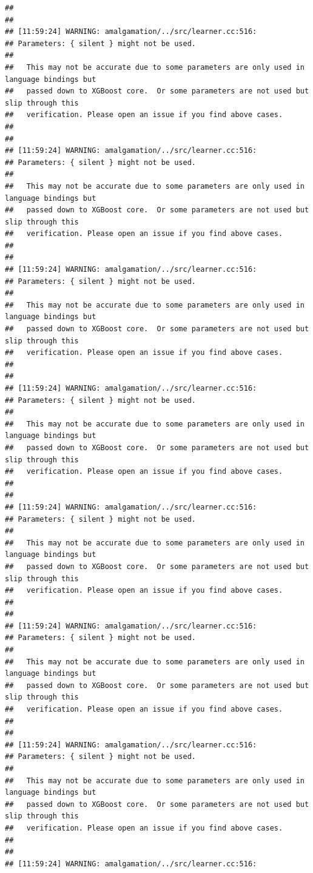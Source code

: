 \documentclass[AMS,STIX2COL]{WileyNJD-v2}\usepackage[]{graphicx}\usepackage[]{color}
\makeatletter
\newenvironment{kframe}{%
 \def\at@end@of@kframe{}%
 \ifinner\ifhmode%
  \def\at@end@of@kframe{\end{minipage}}%
  \begin{minipage}{\columnwidth}%
 \fi\fi%
 \def\FrameCommand##1{\hskip\@totalleftmargin \hskip-\fboxsep
 \colorbox{shadecolor}{##1}\hskip-\fboxsep
     \hskip-\linewidth \hskip-\@totalleftmargin \hskip\columnwidth}%
 \MakeFramed {\advance\hsize-\width
   \@totalleftmargin\z@ \linewidth\hsize
   \@setminipage}}%
 {\par\unskip\endMakeFramed%
 \at@end@of@kframe}
\newenvironment{knitrout}{}{} %
\makeatother
\begin{document}
\begin{knitrout}
\begin{kframe}
\begin{verbatim}
## 
## 
## [11:59:24] WARNING: amalgamation/../src/learner.cc:516: 
## Parameters: { silent } might not be used.
## 
##   This may not be accurate due to some parameters are only used in language bindings but
##   passed down to XGBoost core.  Or some parameters are not used but slip through this
##   verification. Please open an issue if you find above cases.
## 
## 
## [11:59:24] WARNING: amalgamation/../src/learner.cc:516: 
## Parameters: { silent } might not be used.
## 
##   This may not be accurate due to some parameters are only used in language bindings but
##   passed down to XGBoost core.  Or some parameters are not used but slip through this
##   verification. Please open an issue if you find above cases.
## 
## 
## [11:59:24] WARNING: amalgamation/../src/learner.cc:516: 
## Parameters: { silent } might not be used.
## 
##   This may not be accurate due to some parameters are only used in language bindings but
##   passed down to XGBoost core.  Or some parameters are not used but slip through this
##   verification. Please open an issue if you find above cases.
## 
## 
## [11:59:24] WARNING: amalgamation/../src/learner.cc:516: 
## Parameters: { silent } might not be used.
## 
##   This may not be accurate due to some parameters are only used in language bindings but
##   passed down to XGBoost core.  Or some parameters are not used but slip through this
##   verification. Please open an issue if you find above cases.
## 
## 
## [11:59:24] WARNING: amalgamation/../src/learner.cc:516: 
## Parameters: { silent } might not be used.
## 
##   This may not be accurate due to some parameters are only used in language bindings but
##   passed down to XGBoost core.  Or some parameters are not used but slip through this
##   verification. Please open an issue if you find above cases.
## 
## 
## [11:59:24] WARNING: amalgamation/../src/learner.cc:516: 
## Parameters: { silent } might not be used.
## 
##   This may not be accurate due to some parameters are only used in language bindings but
##   passed down to XGBoost core.  Or some parameters are not used but slip through this
##   verification. Please open an issue if you find above cases.
## 
## 
## [11:59:24] WARNING: amalgamation/../src/learner.cc:516: 
## Parameters: { silent } might not be used.
## 
##   This may not be accurate due to some parameters are only used in language bindings but
##   passed down to XGBoost core.  Or some parameters are not used but slip through this
##   verification. Please open an issue if you find above cases.
## 
## 
## [11:59:24] WARNING: amalgamation/../src/learner.cc:516: 

\end{verbatim}
\end{kframe}
\end{knitrout}
\end{document}
